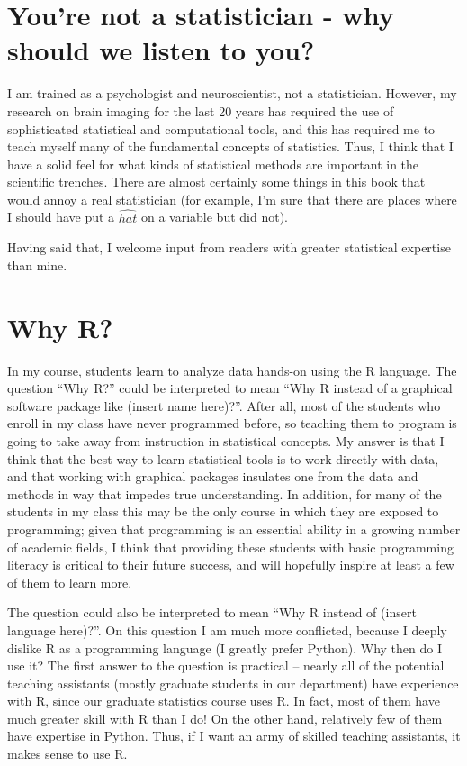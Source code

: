 \documentclass[]{book}
\theoremstyle{definition}
\theoremstyle{definition}
\theoremstyle{definition}
\theoremstyle{remark}
\begin{document}
\section{You're not a statistician - why should we listen to
you?}\label{youre-not-a-statistician---why-should-we-listen-to-you}

I am trained as a psychologist and neuroscientist, not a statistician.
However, my research on brain imaging for the last 20 years has required
the use of sophisticated statistical and computational tools, and this
has required me to teach myself many of the fundamental concepts of
statistics. Thus, I think that I have a solid feel for what kinds of
statistical methods are important in the scientific trenches. There are
almost certainly some things in this book that would annoy a real
statistician (for example, I'm sure that there are places where I should
have put a \(\hat{hat}\) on a variable but did not).

Having said that, I welcome input from readers with greater statistical
expertise than mine.

\section{Why R?}\label{why-r}

In my course, students learn to analyze data hands-on using the R
language. The question ``Why R?'' could be interpreted to mean ``Why R
instead of a graphical software package like (insert name here)?''.
After all, most of the students who enroll in my class have never
programmed before, so teaching them to program is going to take away
from instruction in statistical concepts. My answer is that I think that
the best way to learn statistical tools is to work directly with data,
and that working with graphical packages insulates one from the data and
methods in way that impedes true understanding. In addition, for many of
the students in my class this may be the only course in which they are
exposed to programming; given that programming is an essential ability
in a growing number of academic fields, I think that providing these
students with basic programming literacy is critical to their future
success, and will hopefully inspire at least a few of them to learn
more.

The question could also be interpreted to mean ``Why R instead of
(insert language here)?''. On this question I am much more conflicted,
because I deeply dislike R as a programming language (I greatly prefer
Python). Why then do I use it? The first answer to the question is
practical -- nearly all of the potential teaching assistants (mostly
graduate students in our department) have experience with R, since our
graduate statistics course uses R. In fact, most of them have much
greater skill with R than I do! On the other hand, relatively few of
them have expertise in Python. Thus, if I want an army of skilled
teaching assistants, it makes sense to use R.
\end{document}
